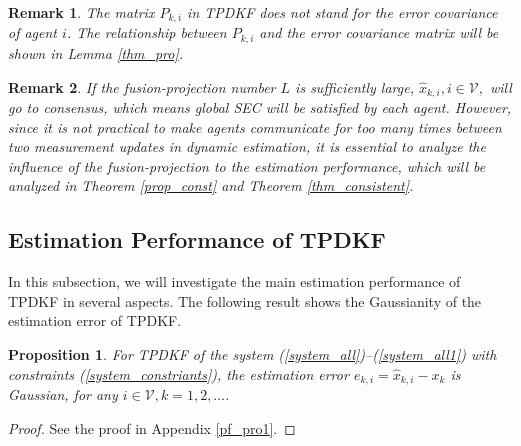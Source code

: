 \documentclass[journal,transmag]{IEEEtran}
\newtheorem{remark}{\textbf{Remark}}
\newtheorem{proposition}{\textbf{Proposition}}
\begin{document}
	
		{	
	\begin{remark}
The matrix $P_{k,i}$  in TPDKF does not stand for the error covariance of agent $i$. The relationship between $P_{k,i}$ and the error covariance matrix will be shown in Lemma \ref{thm_pro}.
		\end{remark}	
		    \begin{remark}
                 If the fusion-projection number $L$ is sufficiently large, $\hat x_{k,i},i\in\mathcal{V},$ will go to consensus, which means global SEC will be satisfied by each agent. However, since it is not practical to make agents communicate for too many times between two measurement updates in dynamic estimation, it is essential to analyze the  influence of the fusion-projection to the estimation performance, which will be analyzed in Theorem \ref{prop_const} and Theorem \ref{thm_consistent}. 
		    \end{remark}		
	\subsection{Estimation Performance of TPDKF}		
	In this subsection, we will investigate the main estimation performance of TPDKF in several aspects.
	The following result shows the Gaussianity of the estimation error of TPDKF.
	
	\begin{proposition}\label{thm_distri}
		{
		For TPDKF of the system (\ref{system_all})--(\ref{system_all1}) with constraints (\ref{system_constriants}), the estimation error $e_{k,i}=\hat x_{k,i}-x_{k}$ is Gaussian, for any $i\in \mathcal{V}, k=1,2,\ldots$.}
	\end{proposition}
	
	\begin{proof}
		See the proof in Appendix \ref{pf_pro1}.
	\end{proof}
	
	
	
}
\end{document}
